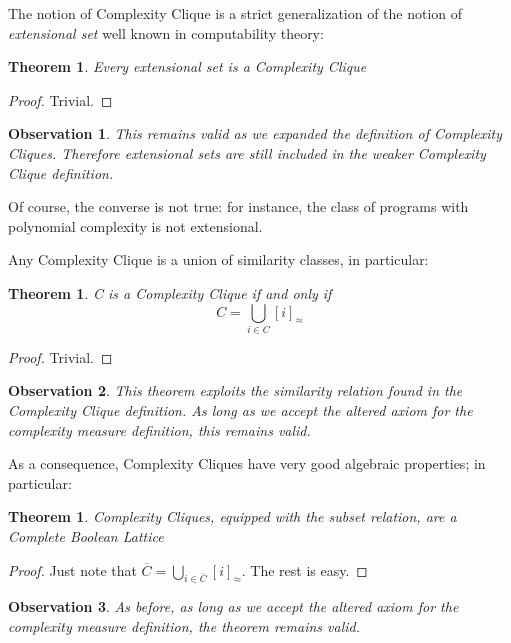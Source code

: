 \documentclass[10pt, a4paper, oneside, titlepage, draft]{article}
\newtheorem{observation}{Observation}[shrd]
\newtheorem{theorem}[shrd]{Theorem}
\begin{document}
The notion of Complexity Clique is a strict generalization of the notion of \emph{extensional set} well known in computability theory:

\begin{theorem}
    Every extensional set is a Complexity Clique
\end{theorem}

\begin{proof}
    Trivial.
\end{proof}

\begin{observation}
    This remains valid as we expanded the definition of Complexity Cliques. Therefore extensional sets are still included in the weaker Complexity Clique definition.
\end{observation}

Of course, the converse is not true: for instance, the class of programs with polynomial complexity is not extensional.

Any Complexity Clique is a union of similarity classes, in particular:

\begin{theorem}
    C is a Complexity Clique if and only if
    \begin{equation*}
        C = \bigcup_{i \in C} [i]_{\approx}
    \end{equation*}
\end{theorem}

\begin{proof}
    Trivial.
\end{proof}

\begin{observation}
    This theorem exploits the similarity relation found in the Complexity Clique definition. As long as we accept the altered axiom for the complexity measure definition, this remains valid.
\end{observation}

As a consequence, Complexity Cliques have very good algebraic properties; in particular:
\begin{theorem}
    Complexity Cliques, equipped with the subset relation, are a Complete Boolean Lattice
\end{theorem}
\begin{proof}
    Just note that $\overline{C} = \bigcup_{i \in \overline{C}}[i]_{\approx}$. The rest is easy.
\end{proof}

\begin{observation}
    As before, as long as we accept the altered axiom for the complexity measure definition, the theorem remains valid.
\end{observation}
\end{document}
